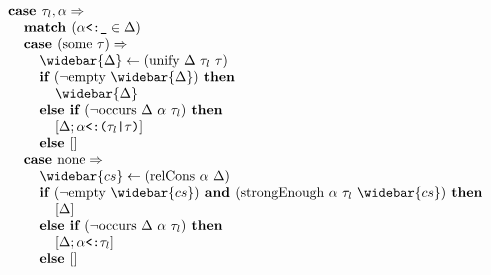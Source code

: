 \documentclass[acmsmall]{acmart}
\begin{document}
\begin{figure*}[h]
\[\begin{array}[t]{@{} l}
\end{array}
\begin{array}[t]{@{} l}
    \I \B{case } \tau_l, \alpha \Rightarrow 
    \\
    \I\I \B{match } (\code{$\alpha$<:\_} \in \Delta)
    \\
    \I\I \B{case } (\F{some } \tau) \Rightarrow
    \\
    \I\I\I \widebar{\Delta} \leftarrow (\F{unify } \Delta\ \tau_l\ \tau)
    \\
    \I\I\I \B{if } (\neg \F{empty } \widebar{\Delta}) \B{ then }
    \\
    \I\I\I\I \widebar{\Delta}
    \\
    \I\I\I \B{else if } (\neg \F{occurs } \Delta\ \alpha\ \tau_l) \B{ then }
    \\
    \I\I\I\I [\Delta;\code{$\alpha$<:($\tau_l$|$\tau$)}] 
    \\
    \I\I\I \B{else } [] 
    \\
    \I\I \B{case } \F{none} \Rightarrow
    \\
    \I\I\I \widebar{cs} \leftarrow (\F{relCons } \alpha\ \Delta)  
    \\
    \I\I\I \B{if } (\neg \F{empty } \widebar{cs}) \B{ and } 
    (\F{strongEnough } \alpha\ \tau_l\ \widebar{cs}) \B{ then }
    \\
    \I\I\I\I [\Delta]
    \\
    \I\I\I \B{else if } (\neg \F{occurs } \Delta\ \alpha\ \tau_l) \B{ then }
    \\
    \I\I\I\I [\Delta;\code{$\alpha$<:$\tau_l$}] 
    \\
    \I\I\I \B{else } []

    \\


\end{array}\]
\end{figure*}
\end{document}
